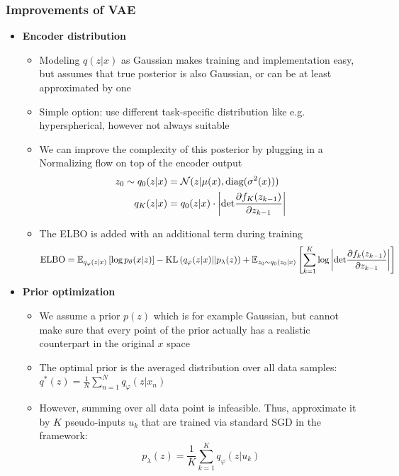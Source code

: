 \subsubsection{Improvements of VAE}
\begin{itemize}
	\item \textbf{Encoder distribution}
	\begin{itemize}
		\item Modeling $q(z|x)$ as Gaussian makes training and implementation easy, but assumes that true posterior is also Gaussian, or can be at least approximated by one
		\item Simple option: use different task-specific distribution like e.g. hyperspherical, however not always suitable
		\item We can improve the complexity of this posterior by plugging in a Normalizing flow on top of the encoder output
		\begin{equation*}
		\begin{split}
		z_0 \sim q_0(z|x) & = \mathcal{N}(z|\mu(x), \text{diag}(\sigma^2(x)))\\
		q_K(z|x) & = q_0(z|x) \cdot \left|\text{det}\frac{\partial f_K(z_{k-1})}{\partial z_{k-1}}\right|\\
		\end{split}
		\end{equation*}
		\item The ELBO is added with an additional term during training
		$$\text{ELBO} = \mathbb{E}_{q_{\varphi}(z|x)}\left[\log p_{\theta}(x|z)\right] - \text{KL}\left(q_{\varphi}(z|x)||p_{\lambda}(z)\right) + \mathbb{E}_{z_0 \sim q_0(z_0|x)}\left[\sum_{k=1}^{K} \log \left|\text{det}\frac{\partial f_k(z_{k-1})}{\partial z_{k-1}}\right|\right]$$
	\end{itemize}
	\item \textbf{Prior optimization}
	\begin{itemize}
		\item We assume a prior $p(z)$ which is for example Gaussian, but cannot make sure that every point of the prior actually has a realistic counterpart in the original $x$ space
		\item The optimal prior is the averaged distribution over all data samples: $q^{*}(z) = \frac{1}{N}\sum_{n=1}^{N} q_{\varphi}(z|x_n)$
		\item However, summing over all data point is infeasible. Thus, approximate it by $K$ pseudo-inputs $u_k$ that are trained via standard SGD in the framework:
		$$p_\lambda(z) = \frac{1}{K} \sum_{k=1}^{K} q_{\varphi}(z|u_k)$$
	\end{itemize}
	
\end{itemize}
